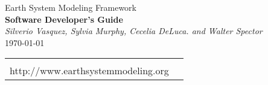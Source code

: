 \documentclass[english,dvips]{article}
\begin{document}

\begin{titlepage}

\begin{center}
{\Large    Earth System Modeling Framework } \\
{\Large {\bf  Software Developer's Guide}} \\
\medskip
{\it Silverio Vasquez, Sylvia Murphy, Cecelia DeLuca. and Walter Spector} \\
\vspace{.5in}
{\large \today}
\end{center}

\begin{latexonly}
\vspace{6in}
\begin{tabular}{p{5in}p{.9in}}
\hrulefill \\
\noindent http://www.earthsystemmodeling.org \\
\end{tabular}
\end{latexonly}

\end{titlepage}

\tableofcontents

\newpage












\end{document}
